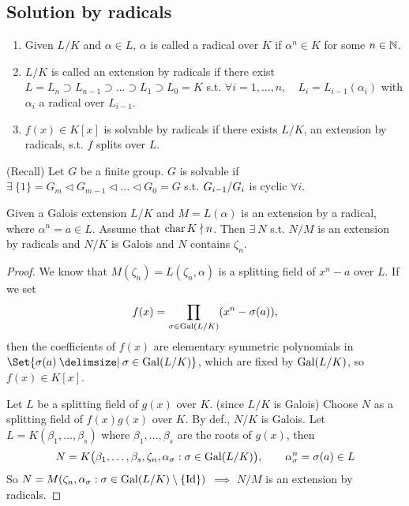 \subsection{Solution by radicals}

\begin{definition} \mbox{}
  \begin{enumerate}
    \item Given $L/K$ and $\alpha \in L$, $\alpha$ is called a radical over $K$
      if $\alpha^n \in K$ for some $n\in \mathbb{N}$.
    \item $L/K$ is called an extension by radicals if there exist
      $L = L_n \supset L_{n-1} \supset \dots \supset L_1 \supset L_0 = K$
      s.t. $\forall i = 1,\dots, n, \quad L_i = L_{i-1}(\alpha_i)$ with
      $\alpha_i$ a radical over $L_{i-1}$.
    \item $f(x) \in K[x]$ is solvable by radicals if there exists $L/K$,
      an extension by radicals, s.t. $f$ splits over $L$.
  \end{enumerate}
\end{definition}

\begin{definition}
  (Recall) Let $G$ be a finite group. $G$ is solvable if
  $\exists\: \{1\} = G_m \lhd G_{m-1} \lhd \dots \lhd G_0 = G$ s.t.
  ${G_{i-1}}/{G_i}$ is cyclic $\forall i$.
\end{definition}


\begin{lemma} \label{lemma:galois-radical-ext}
  Given a Galois extension $L/K$ and $M = L(\alpha)$ is an extension by
  a radical, where $\alpha^n = a \in L$. Assume that $\operatorname{char} K \nmid n$. Then
  $\exists\: N$ s.t. $N/M$ is an extension by radicals and $N/K$ is Galois
  and $N$ contains $\zeta_n$.
  \begin{proof}
    We know that $M(\zeta_n) = L(\zeta_n, \alpha)$ is a splitting field of
    $x^n - a$ over $L$. If we set
    \[ f(x) = \prod_{\sigma \in \operatorname{Gal}(L/K)} (x^n - \sigma(a)), \]
    then the coefficients of $f(x)$ are elementary symmetric polynomials in
    $\Set{\sigma(a) \given \sigma \in \Gal(L/K) }$, which are fixed by
    $\operatorname{Gal}(L/K)$, so $f(x) \in K[x]$.

    Let $L$ be a splitting field of $g(x)$ over $K$. (since $L/K$ is Galois)
    Choose $N$ as a splitting field of $f(x)g(x)$ over $K$.
    By def., $N/K$ is Galois. Let $L = K(\beta_1,\dots,\beta_s)$ where
    $\beta_1, \dots, \beta_s$ are the roots of $g(x)$, then
    \[
      N = K\big(\beta_1,\dots,\beta_s, \zeta_n,
        \alpha_\sigma : \sigma \in \operatorname{Gal}(L/K)
      \big),
      \qquad \alpha_\sigma^n = \sigma(a) \in L
    \]
    So $N = M(\zeta_n, \alpha_\sigma : \sigma \in \operatorname{Gal}(L/K) \setminus \{ {\rm Id} \})$
    $\implies$ $N/M$ is an extension by radicals.
  \end{proof}
\end{lemma}

